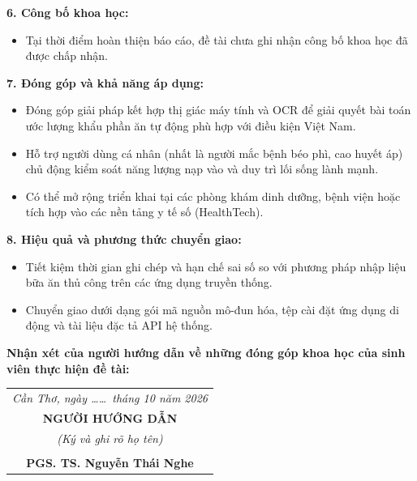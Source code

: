 \vspace{0.3cm}
\noindent\textbf{6. Công bố khoa học:}
\begin{itemize}[leftmargin=0.8cm, label=\textbullet, itemsep=2pt, topsep=2pt]
    \item[] Tại thời điểm hoàn thiện báo cáo, đề tài chưa ghi nhận công bố khoa học đã được chấp nhận.
\end{itemize}

\vspace{0.3cm}
\noindent\textbf{7. Đóng góp và khả năng áp dụng:}
\begin{itemize}[leftmargin=0.8cm, label=\textbullet, itemsep=2pt, topsep=2pt]
    \item Đóng góp giải pháp kết hợp thị giác máy tính và OCR để giải quyết bài toán ước lượng khẩu phần ăn tự động phù hợp với điều kiện Việt Nam.
    \item Hỗ trợ người dùng cá nhân (nhất là người mắc bệnh béo phì, cao huyết áp) chủ động kiểm soát năng lượng nạp vào và duy trì lối sống lành mạnh.
    \item Có thể mở rộng triển khai tại các phòng khám dinh dưỡng, bệnh viện hoặc tích hợp vào các nền tảng y tế số (HealthTech).
\end{itemize}

\vspace{0.3cm}
\noindent\textbf{8. Hiệu quả và phương thức chuyển giao:}
\begin{itemize}[leftmargin=0.8cm, label=\textbullet, itemsep=2pt, topsep=2pt]
    \item Tiết kiệm thời gian ghi chép và hạn chế sai số so với phương pháp nhập liệu bữa ăn thủ công trên các ứng dụng truyền thống.
    \item Chuyển giao dưới dạng gói mã nguồn mô-đun hóa, tệp cài đặt ứng dụng di động và tài liệu đặc tả API hệ thống.
\end{itemize}

\vspace{0.6cm}
\noindent\textbf{Nhận xét của người hướng dẫn về những đóng góp khoa học của sinh viên thực hiện đề tài:}\par
\vspace{0.2cm}
\noindent\dotfill\par
\vspace{0.1cm}
\noindent\dotfill\par
\vspace{0.1cm}
\noindent\dotfill\par
\vspace{0.1cm}
\noindent\dotfill\par

\vspace{0.8cm}
\hfill
\begin{tabular}{c}
    \textit{Cần Thơ, ngày \dots\dots\ tháng 10 năm 2026} \\
    \textbf{NGƯỜI HƯỚNG DẪN} \\
    \textit{(Ký và ghi rõ họ tên)} \\
    \vspace{2.0cm} \\
    \textbf{PGS. TS. Nguyễn Thái Nghe}
\end{tabular}